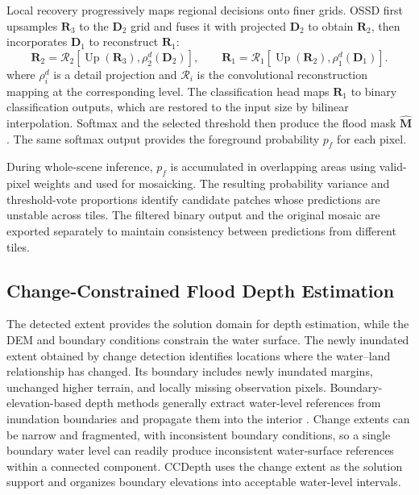\documentclass[authoryear,preprint,12pt]{elsarticle}
\begin{document}
Local recovery progressively maps regional decisions onto finer grids. OSSD first upsamples \(\mathbf R_3\) to the \(\mathbf D_2\) grid and fuses it with projected \(\mathbf D_2\) to obtain \(\mathbf R_2\), then incorporates \(\mathbf D_1\) to reconstruct \(\mathbf R_1\):
\begin{equation}\label{eq:oscd_reconstruction}
  \mathbf{R}_{2}
  =
  \mathcal{R}_{2}\!\left[
  \operatorname{Up}(\mathbf{R}_{3}),\rho_{2}^{d}(\mathbf{D}_{2})
  \right],
  \qquad
  \mathbf{R}_{1}
  =
  \mathcal{R}_{1}\!\left[
  \operatorname{Up}(\mathbf{R}_{2}),\rho_{1}^{d}(\mathbf{D}_{1})
  \right].
\end{equation}
where \(\rho_i^d\) is a detail projection and \(\mathcal R_i\) is the convolutional reconstruction mapping at the corresponding level. The classification head maps \(\mathbf R_1\) to binary classification outputs, which are restored to the input size by bilinear interpolation. Softmax and the selected threshold then produce the flood mask \(\hat{\mathbf M}\). The same softmax output provides the foreground probability \(p_f\) for each pixel.

During whole-scene inference, \(p_f\) is accumulated in overlapping areas using valid-pixel weights and used for mosaicking. The resulting probability variance and threshold-vote proportions identify candidate patches whose predictions are unstable across tiles. The filtered binary output and the original mosaic are exported separately to maintain consistency between predictions from different tiles.

\subsection{Change-Constrained Flood Depth Estimation}\label{sec:ccdepth}

The detected extent provides the solution domain for depth estimation, while the DEM and boundary conditions constrain the water surface. The newly inundated extent obtained by change detection identifies locations where the water--land relationship has changed. Its boundary includes newly inundated margins, unchanged higher terrain, and locally missing observation pixels. Boundary-elevation-based depth methods generally extract water-level references from inundation boundaries and propagate them into the interior \citep{cohen2019floodwater,betterle2024water}. Change extents can be narrow and fragmented, with inconsistent boundary conditions, so a single boundary water level can readily produce inconsistent water-surface references within a connected component. CCDepth uses the change extent as the solution support and organizes boundary elevations into acceptable water-level intervals.
\end{document}
